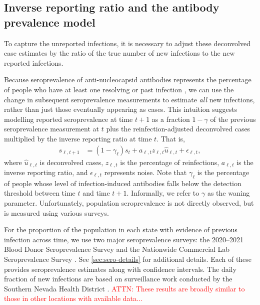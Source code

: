 \documentclass{article}
\newcommand{\attn }[1]{\textcolor{red}{ATTN: #1}}
\begin{document}
\subsection{Inverse reporting ratio and the antibody prevalence model} 
\label{sec:report-ratio}

To capture the unreported infections, it is necessary to adjust these deconvolved case estimates by the ratio of the true number of new infections
to the new reported infections. 

Because seroprevalence of anti-nucleocapsid antibodies represents the percentage
of people who have at least one resolving or past infection \citep{cdc2020data},
we can use the change in subsequent seroprevalence measurements to estimate
\emph{all} new infections, rather than just those eventually appearing as cases.
This intuition suggests modelling reported seroprevalence at time $t+1$ as a
fraction $1-\gamma$ of the previous seroprevalence measurement at $t$ plus the
reinfection-adjusted deconvolved cases multiplied by
the inverse reporting ratio at time $t$. That is, 
\begin{align}
s_{\ell,t+1} &= (1 -\gamma_{\ell}) s_t + a_{\ell,t} z_{\ell,t} \widehat{u}_{\ell,t} + \epsilon_{\ell,t},
\end{align}
where $\widehat{u}_{\ell,t}$ is deconvolved cases,
$z_{\ell,t}$ is the percentage of reinfections, $a_{\ell,t}$ is the inverse
reporting ratio, and $\epsilon_{\ell,t}$ represents noise. Note that
$\gamma_{\ell}$ is the percentage of people whose level of infection-induced
antibodies falls below the detection threshold between time $t$ and time
$t+1$. Informally, we refer to $\gamma$ as the waning parameter. Unfortunately,
population seroprevalence is not directly observed, but is measured using
various surveys.

For the proportion of the population in each state with
evidence of previous infection across time, we use two major seroprevalence
surveys: the 2020--2021 Blood Donor Seroprevalence Survey and the Nationwide
Commercial Lab Seroprevalence Survey \citep{cdc2021blood, cdc2021comm}. See
\autoref{sec:sero-details} for additional details. Each of these provides
seroprevalence estimates along with confidence intervals.
The daily fraction of new infections are based on surveillance work conducted by
the Southern Nevada Health District \citep{ruff2022rapid}. \attn{These results
are broadly similar to those in other locations with available data...}
\end{document}
